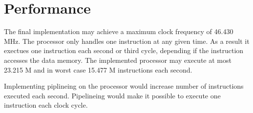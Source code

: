 \section{Performance}
The final implementation may achieve a maximum clock frequency of 46.430 MHz.
The processor only handles one instruction at any given time.
As a result it exectues one instruction each second or third cycle, depending if the instruction accesses the data memory.
The implemented processor may execute at most 23.215 M and in worst case 15.477 M instructions each second.

Implementing piplineing on the processor would increase number of instructions executed each second.
Pipelineing would make it possible to execute one instruction each clock cycle.
